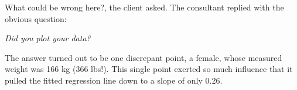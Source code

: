 \documentclass[
  letterpaper,
  10pt,
  krantz2]{krantz}
\makeatletter
\newenvironment{Shaded}{\begin{snugshade}}{\end{snugshade}}
\newcommand{\AttributeTok}[1]{\textcolor[rgb]{0.40,0.45,0.13}{#1}}
\newcommand{\ConstantTok}[1]{\textcolor[rgb]{0.56,0.35,0.01}{#1}}
\newcommand{\DecValTok}[1]{\textcolor[rgb]{0.68,0.00,0.00}{#1}}
\newcommand{\FunctionTok}[1]{\textcolor[rgb]{0.28,0.35,0.67}{#1}}
\newcommand{\NormalTok}[1]{\textcolor[rgb]{0.00,0.23,0.31}{#1}}
\newcommand{\SpecialCharTok}[1]{\textcolor[rgb]{0.37,0.37,0.37}{#1}}
\newcommand{\StringTok}[1]{\textcolor[rgb]{0.13,0.47,0.30}{#1}}
\renewenvironment{quote}{\begin{VF}}{\end{VF}}
\newenvironment{kframe}{%
  \medskip{}
  \setlength{\fboxsep}{.8em}
  \def\at@end@of@kframe{}%
  \ifinner\ifhmode%
  \def\at@end@of@kframe{\end{minipage}}%
  \begin{minipage}{\columnwidth}%
  \fi\fi%
  \def\FrameCommand##1{\hskip\@totalleftmargin \hskip-\fboxsep
  \colorbox{shadecolor}{##1}\hskip-\fboxsep
      \hskip-\linewidth \hskip-\@totalleftmargin \hskip\columnwidth}%
  \MakeFramed {\advance\hsize-\width
    \@totalleftmargin\z@ \linewidth\hsize
    \@setminipage}}%
{\par\unskip\endMakeFramed%
  \at@end@of@kframe}
\renewenvironment{Shaded}{\begin{kframe}}{\end{kframe}}
\makeatother
\begin{document}
What could be wrong here?, the client asked. The consultant replied with
the obvious question:

\begin{quote}
\emph{Did you plot your data?}
\end{quote}

The answer turned out to be one discrepant point, a female, whose
measured weight was 166 kg (366 lbs!). This single point exerted so much
influence that it pulled the fitted regression line down to a slope of
only 0.26.

\begin{Shaded}
\end{Shaded}
\end{document}
